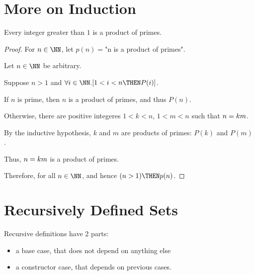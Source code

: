 \documentclass[11pt]{scrartcl}
\begin{document}
\section{More on Induction}

\begin{theorem}
Every integer greater than $1$ is a product of primes.
\end{theorem}
\begin{proof}
  For $n\in\NN$, let $p(n)=$"n is a product of primes".

  Let $n\in\NN$ be arbitrary.

  Suppose $n>1$ and $\forall i\in \NN.[1<i<n \THEN P(i)]$.

  If $n$ is prime, then $n$ is a product of primes, and thus $P(n)$.

  Otherwise, there are positive integeres $1<k<n$, $1< m < n$ such that $n = k\* m$.

  By the inductive hypothesis, $k$ and $m$ are products of primes: $P(k)$ and $P(m)$.

  Thus, $n = k\*m$ is a product of primes.

  Therefore, for all $n\in\NN$, and hence $(n>1)\THEN p(n)$.
\end{proof}

\section{Recursively Defined Sets}

Recursive definitions have 2 parts:
\begin{itemize}
\item a base case, that does not depend on anything else
\item a constructor case, that depends on previous cases.
\end{itemize}
\end{document}
